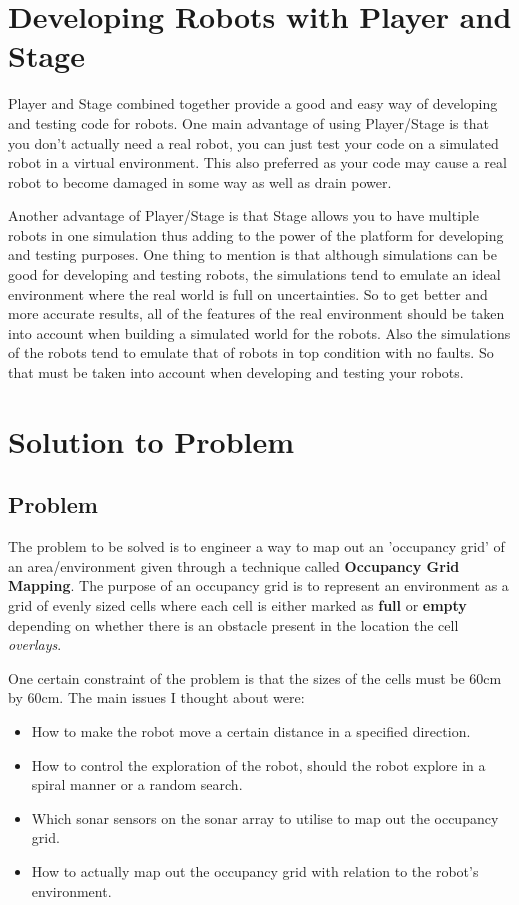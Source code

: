 \documentclass[a4paper,12pt]{article}
\begin{document}
\section{Developing Robots with Player and Stage}
\noindent Player and Stage combined together provide a good and easy way of developing and testing code for robots. One main advantage of using Player/Stage is that you don't actually need a real robot, you can just test your code on a simulated robot in a virtual environment. This also preferred as your code may cause a real robot to become damaged in some way as well as drain power.

\vspace{5mm}
\noindent Another advantage of Player/Stage is that Stage allows you to have multiple robots in one simulation thus adding to the power of the platform for developing and testing purposes. One thing to mention is that although simulations can be good for developing and testing robots, the simulations tend to emulate an ideal environment where the real world is full on uncertainties. So to get better and more accurate results, all of the features of the real environment should be taken into account when building a simulated world for the robots. Also the simulations of the robots tend to emulate that of robots in top condition with no faults. So that must be taken into account when developing and testing your robots.

\section{Solution to Problem}

\subsection{Problem}
\noindent The problem to be solved is to engineer a way to map out an 'occupancy grid' of an area/environment given through a technique called \textbf{Occupancy Grid Mapping}. The purpose of an occupancy grid is to represent an environment as a grid of evenly sized cells where each cell is either marked as \textbf{full} or \textbf{empty} depending on whether there is an obstacle present in the location the cell \textit{overlays}.

\vspace{5mm}
\noindent One certain constraint of the problem is that the sizes of the cells must be 60cm by 60cm. The main issues I thought about were:

\begin{itemize}
	\item How to make the robot move a certain distance in a specified direction.
	\item How to control the exploration of the robot, should the robot explore in a spiral manner or a random search.
	\item Which sonar sensors on the sonar array to utilise to map out the occupancy grid.
	\item How to actually map out the occupancy grid with relation to the robot's environment.
\end{itemize}
 
\end{document}
